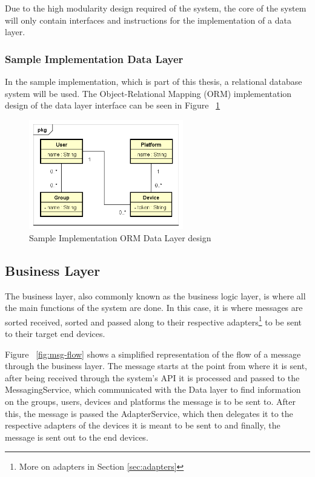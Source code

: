 Due to the high modularity design required of the system, the core of the system will only contain interfaces and instructions for the implementation of a data layer.

\subsubsection{Sample Implementation Data Layer}
In the sample implementation, which is part of this thesis, a relational database system will be used. The Object-Relational Mapping (ORM) implementation design of the data layer interface can be seen in Figure ~\ref{fig:orm}

\begin{figure}[H]
	\centering
	\includegraphics[width=0.6\textwidth]{figures/03_design/orm}
    \caption{Sample Implementation ORM Data Layer design}
    \label{fig:orm}
\end{figure}

\subsection{Business Layer}
The business layer, also commonly known as the business logic layer, is where all the main functions of the system are done. In this case, it is where messages are sorted received, sorted and passed along to their respective adapters\footnote{More on adapters in Section \ref{sec:adapters}} to be sent to their target end devices. 

Figure ~\ref{fig:msg-flow} shows a simplified representation of the flow of a message through the business layer. The message starts at the point from where it is sent, after being received through the system's API it is processed and passed to the MessagingService, which communicated with the Data layer to find information on the groups, users, devices and platforms the message is to be sent to. After this, the message is passed the AdapterService, which then delegates it to the respective adapters of the devices it is meant to be sent to and finally, the message is sent out to the end devices.

